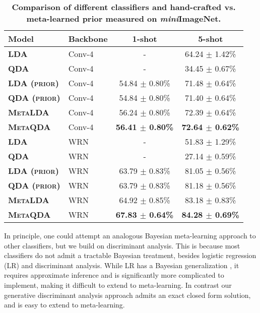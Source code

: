 \documentclass[10pt,twocolumn,letterpaper]{article}
\def\miniIN{\textit{mini}ImageNet}
\begin{document}
\setlength{\tabcolsep}{4.8pt}
\begin{table}[tb]
\centering
\footnotesize
\begin{tabular}{@{} llcc @{}}
\toprule
{\bf Model} & {\bf Backbone} & 1-shot & 5-shot \\
\midrule 

\textbf{\textsc{LDA}} & Conv-4 & - & 64.24 $\pm$ 1.42\% \\
\textbf{\textsc{QDA}} & Conv-4 & - & 34.45 $\pm$ 0.67\% \\
\textbf{\textsc{LDA (prior)}} & Conv-4 & 54.84 $\pm$ 0.80\% & 71.48 $\pm$ 0.64\% \\ 
\textbf{\textsc{QDA (prior)}} & Conv-4 & 54.84 $\pm$ 0.80\% & 71.40 $\pm$ 0.64\% \\
\textbf{\textsc{MetaLDA}} & Conv-4 & 56.24 $\pm$ 0.80\% & 72.39 $\pm$ 0.64\% \\ 
\textbf{\textsc{MetaQDA}} & Conv-4 & \bf{56.41 $\pm$ 0.80\%} & \bf{72.64 $\pm$ 0.62\%} \\ 
\midrule 
\textbf{\textsc{LDA}} & WRN & - & 51.83 $\pm$ 1.29\% \\ 
\textbf{\textsc{QDA}} & WRN & - & 27.14 $\pm$ 0.59\% \\
\textbf{\textsc{LDA (prior)}} & WRN & 63.79 $\pm$ 0.83\% & 81.05 $\pm$ 0.56\% \\ 
\textbf{\textsc{QDA (prior)}} & WRN & 63.79 $\pm$ 0.83\% & 81.18 $\pm$ 0.56\% \\ 
\textbf{\textsc{MetaLDA}} & WRN & 64.92 $\pm$ 0.85\% & 83.18 $\pm$ 0.83\% \\ 
\textbf{\textsc{MetaQDA}} & WRN & \bf{67.83 $\pm$ 0.64\%} & \bf{84.28 $\pm$ 0.69\%} \\ 

\bottomrule
\end{tabular}\caption{\small \small
\textbf{Comparison of different classifiers and hand-crafted vs. meta-learned prior measured on \miniIN. }
}
\label{tab:ablation1}
\end{table}




In principle, one could attempt an analogous Bayesian meta-learning approach to other classifiers, but we build on discriminant analysis. This is because most classifiers do not admit a tractable Bayesian treatment, besides logistic regression (LR) and discriminant analysis. While LR has a Bayesian generalization \cite{mackay1992bayesLR}, it requires approximate inference and is significantly more complicated to implement, making it difficult to extend to meta-learning. In contrast our generative discriminant analysis approach admits an exact closed form solution, and is easy to extend to meta-learning.
\end{document}
